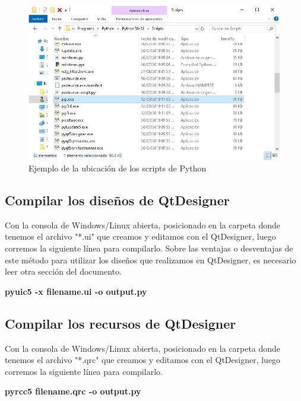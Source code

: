 \begin{figure}[H]
    \centering
    \includegraphics[scale=0.3]{imagenes/cmd/cmd_6.PNG}
    \caption{Ejemplo de la ubicaci\'on de los scripts de Python}
\end{figure}

\subsection{Compilar los dise\~nos de QtDesigner}
Con la consola de Windows/Linux abierta, posicionado en la carpeta donde tenemos el archivo "*.ui" que creamos y editamos con el QtDesigner,
luego corremos la siguiente l\'inea para compilarlo. Sobre las ventajas o desventajas de este m\'etodo para utilizar los dise\~nos que realizamos en QtDesigner,
es necesario leer otra secci\'on del documento.

\begin{center}
    \textbf{pyuic5 -x filename.ui -o output.py}
\end{center}

\subsection{Compilar los recursos de QtDesigner}
Con la consola de Windows/Linux abierta, posicionado en la carpeta donde tenemos el archivo "*.qrc" que creamos y editamos con el QtDesigner,
luego corremos la siguiente l\'inea para compilarlo.

\begin{center}
    \textbf{pyrcc5 filename.qrc -o output.py}
\end{center}
